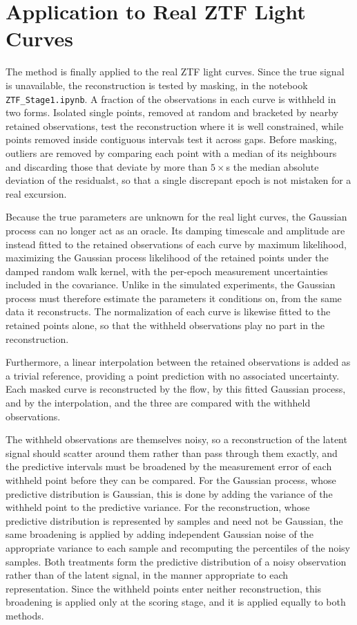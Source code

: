\newpage

\section{Application to Real ZTF Light Curves}
\label{sec:realztf}

The method is finally applied to the real ZTF light curves. Since the true signal is unavailable, the reconstruction is tested by masking, in the notebook \texttt{ZTF\_Stage1.ipynb}. A fraction of the observations in each curve is withheld in two forms. Isolated single points, removed at random and bracketed by nearby retained observations, test the reconstruction where it is well constrained, while points removed inside contiguous intervals test it across gaps. Before masking, outliers are removed by comparing each point with a median of its neighbours and discarding those that deviate by more than $5 \times$s the median absolute deviation of the residualst, so that a single discrepant epoch is not mistaken for a real excursion.

Because the true parameters are unknown for the real light curves, the Gaussian process can no longer act as an oracle. Its damping timescale and amplitude are instead fitted to the retained observations of each curve by maximum likelihood, maximizing the Gaussian process likelihood of the retained points under the damped random walk kernel, with the per-epoch measurement uncertainties included in the covariance. Unlike in the simulated experiments, the Gaussian process must therefore estimate the parameters it conditions on, from the same data it reconstructs. The normalization of each curve is likewise fitted to the retained points alone, so that the withheld observations play no part in the reconstruction.

Furthermore, a linear interpolation between the retained observations is added as a trivial reference, providing a point prediction with no associated uncertainty. Each masked curve is reconstructed by the flow, by this fitted Gaussian process, and by the interpolation, and the three are compared with the withheld observations.

The withheld observations are themselves noisy, so a reconstruction of the latent signal should scatter around them rather than pass through them exactly, and the predictive intervals must be broadened by the measurement error of each withheld point before they can be compared. For the Gaussian process, whose predictive distribution is Gaussian, this is done by adding the variance of the withheld point to the predictive variance. For the reconstruction, whose predictive distribution is represented by samples and need not be Gaussian, the same broadening is applied by adding independent Gaussian noise of the appropriate variance to each sample and recomputing the percentiles of the noisy samples. Both treatments form the predictive distribution of a noisy observation rather than of the latent signal, in the manner appropriate to each representation. Since the withheld points enter neither reconstruction, this broadening is applied only at the scoring stage, and it is applied equally to both methods.

